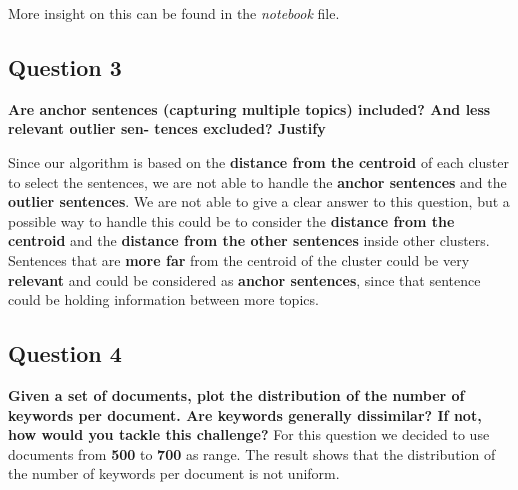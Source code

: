 More insight on this can be found in the \textit{notebook} file.

\subsection{Question 3}
\textbf{ Are anchor sentences (capturing multiple topics) included? And less relevant outlier sen- tences excluded? Justify}

Since our algorithm is based on the \textbf{distance from the centroid} of each
cluster to select the sentences, we are not able to handle the \textbf{anchor
  sentences} and the \textbf{outlier sentences}. We are not able to give a clear
answer to this question, but a possible way to handle this could be to consider
the \textbf{distance from the centroid} and the \textbf{distance from the other
  sentences} inside other clusters. Sentences that are \textbf{more far} from the
centroid of the cluster could be very \textbf{relevant} and could be considered
as \textbf{anchor sentences}, since that sentence could be holding information
between more topics.

\subsection{Question 4}
\textbf{Given a set of documents, plot the distribution of the number of keywords per document. Are keywords generally dissimilar? If not, how would you tackle this challenge?}
For this question we decided to use documents from \textbf{500} to \textbf{700} as range.
The result shows that the distribution of the number of keywords per
document is not uniform.


